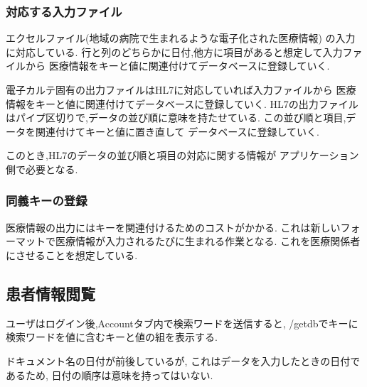 	\subsubsection{対応する入力ファイル}
	エクセルファイル(地域の病院で生まれるような電子化された医療情報)
	の入力に対応している.
	行と列のどちらかに日付,他方に項目があると想定して入力ファイルから
	医療情報をキーと値に関連付けてデータベースに登録していく.

	電子カルテ固有の出力ファイルはHL7に対応していれば入力ファイルから
	医療情報をキーと値に関連付けてデータベースに登録していく.
	HL7の出力ファイルはパイプ区切りで,データの並び順に意味を持たせている.
	この並び順と項目,データを関連付けてキーと値に置き直して
	データベースに登録していく.

	このとき,HL7のデータの並び順と項目の対応に関する情報が
	アプリケーション側で必要となる.



	\subsubsection{同義キーの登録}
	医療情報の出力にはキーを関連付けるためのコストがかかる.
	これは新しいフォーマットで医療情報が入力されるたびに生まれる作業となる.
	これを医療関係者にさせることを想定している.


\subsection{患者情報閲覧}

	ユーザはログイン後,Accountタブ内で検索ワードを送信すると,
	/getdbでキーに検索ワードを値に含むキーと値の組を表示する.

	ドキュメント名の日付が前後しているが,
	これはデータを入力したときの日付であるため,
	日付の順序は意味を持ってはいない.
	

